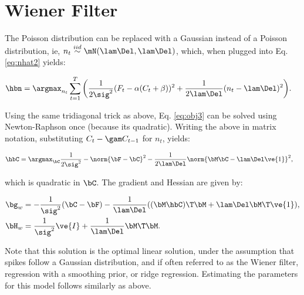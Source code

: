 \section{Wiener Filter} \label{sec:wiener}

The Poisson distribution can be replaced with a Gaussian instead of a Poisson distribution, ie,  $n_t \overset{iid}{\sim} \mN(\lam \Del, \lam \Del)$, which, when plugged into Eq. \eqref{eq:nhat2} yields:

\begin{align} \label{eq:obj3}
\hbn &= \argmax_{n_t}  \sum_{t=1}^T \bigg( \frac{1}{2 \sig^2}(F_t - \alpha(C_t + \beta))^2  + 
 \frac{1}{2 \lam \Del}(n_t - \lam \Del)^2\bigg).
\end{align}

Using the same tridiagonal trick as above, Eq. \eqref{eq:obj3} can be solved using Newton-Raphson once (because its quadratic).  Writing the above in matrix notation, substituting $C_t - \gam C_{t-1}$ for $n_t$, yields:

\begin{align}   \label{eq:w2}
\hbC&= \argmax_{\bC} \frac{1}{2\sig^2} -\norm{\bF - \bC}^2 - \frac{1}{2\lam\Del} \norm{\bM \bC - \lam\Del\ve{1}}^2,
\end{align}

\noindent which is quadratic in $\bC$.  The gradient and Hessian are given by:

\begin{align}
\bg_w &= -\frac{1}{\sig^2} (\bC - \bF) - \frac{1}{\lam\Del} ( (\bM \hbC)\T \bM + \lam\Del \bM\T \ve{1}), \\
\bH_w &= \frac{1}{\sig^2} \ve{I} + \frac{1}{\lam\Del} \bM\T \bM.
\end{align}

Note that this solution is the optimal linear solution, under the assumption that spikes follow a Gaussian distribution, and if often referred to as the Wiener filter, regression with a smoothing prior, or ridge regression.  Estimating the parameters for this model follows similarly as above. 